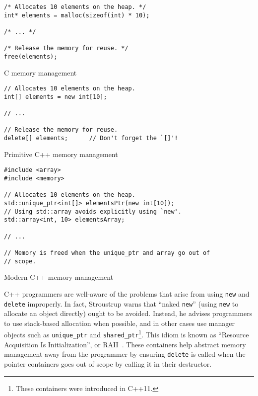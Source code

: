 \documentclass[finalcopy]{srpaper}
\begin{document}
\begin{listing}[H]
\begin{verbatim}
/* Allocates 10 elements on the heap. */
int* elements = malloc(sizeof(int) * 10);

/* ... */

/* Release the memory for reuse. */
free(elements);
\end{verbatim}
\caption{C memory management}
\label{lst:cmemory}
\end{listing}

\begin{listing}[H]
\begin{verbatim}
// Allocates 10 elements on the heap.
int[] elements = new int[10];

// ...

// Release the memory for reuse.
delete[] elements;      // Don't forget the `[]'!
\end{verbatim}
\caption{Primitive C++ memory management}
\label{lst:cppmemory}
\end{listing}

\begin{listing}
\begin{verbatim}
#include <array>
#include <memory>

// Allocates 10 elements on the heap.
std::unique_ptr<int[]> elementsPtr(new int[10]);
// Using std::array avoids explicitly using `new'.
std::array<int, 10> elementsArray;

// ...

// Memory is freed when the unique_ptr and array go out of
// scope.
\end{verbatim}
\label{lst:cppmodernmemory}
\caption{Modern C++ memory management}
\end{listing}

C++ programmers are well-aware of the problems that arise from using
\texttt{new} and \texttt{delete} improperly. In fact, Stroustrup warns that
``naked \texttt{new}'' (using \texttt{new} to allocate an object directly)
ought to be avoided. Instead, he advises programmers to use stack-based
allocation when possible, and in other cases use manager objects such as
\texttt{unique\_ptr} and \texttt{shared\_ptr}\footnote{These containers were
    introduced in C++11.}. This idiom is known as ``Resource Acquisition Is
Initialization'', or RAII~\cite{stroustrup2013the}. These containers help
abstract memory management away from the programmer by ensuring \texttt{delete}
is called when the pointer containers goes out of scope by calling it in their
destructor.
\end{document}
